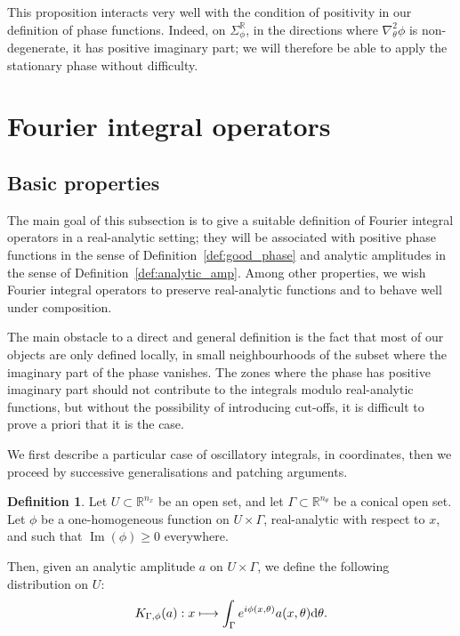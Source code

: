 \documentclass[10pt]{amsart}
\theoremstyle{definition}\newtheorem{defi}[theo]{Definition}\newtheorem{rema}[theo]{Remark}\newtheorem{exam}[theo]{Example}\newtheorem{exem}[theo]{Example}\newtheorem{nota}[theo]{Notation}
\DeclareMathOperator{\im}{Im}
\newcommand\1{\mathds{1}}
\newcommand{\R}{\mathbb{R}}
\newcommand{\dd}{\mathrm{d}}
\let\oldmapsto\mapsto
\renewcommand*{\mapsto}{\mathchoice{\longmapsto}{\oldmapsto}{\oldmapsto}{\oldmapsto}}
\begin{document}
This proposition interacts very well with the condition of positivity in our definition of phase functions. Indeed, on $\Sigma_{\phi}^{\R}$, in the directions where $\nabla^2_{\theta}\phi$ is non-degenerate, it has positive imaginary part; we will therefore be able to apply the stationary phase without difficulty.


\section{Fourier integral operators}\label{sec:four-integr-oper}

\subsection{Basic properties}\label{sec:first-properties}

The main goal of this subsection is to give a suitable definition of Fourier integral operators in a real-analytic setting; they will be associated with positive phase functions in the sense of Definition~\ref{def:good_phase} and analytic amplitudes in the sense of Definition~\ref{def:analytic_amp}. Among other properties, we wish Fourier integral operators to preserve real-analytic functions and to behave well under composition.

The main obstacle to a direct and general definition is the fact that most of our objects are only defined locally, in small neighbourhoods of the subset where the imaginary part of the phase vanishes. The zones where the phase has positive imaginary part should not contribute to the integrals modulo real-analytic functions, but without the possibility of introducing cut-offs, it is difficult to prove a priori that it is the case.

We first describe a particular case of oscillatory integrals, in coordinates, then we proceed by successive generalisations and patching arguments.

\begin{defi}\label{def:osc_int}
Let $U\subset \R^{n_x}$ be an open set, and let $\Gamma\subset \R^{n_{\theta}}$ be a conical open set. Let $\phi$ be a one-homogeneous function on $U\times \Gamma$, real-analytic with respect to $x$, and such that $\im(\phi)\geq 0$ everywhere.

Then, given an analytic amplitude $a$ on $U\times \Gamma$, we define the following distribution on $U$:
\[
K_{\Gamma,\phi}(a):x\mapsto \int_{\Gamma} e^{i\phi(x,\theta)}a(x,\theta)\dd \theta.
\]
\end{defi}
\end{document}
